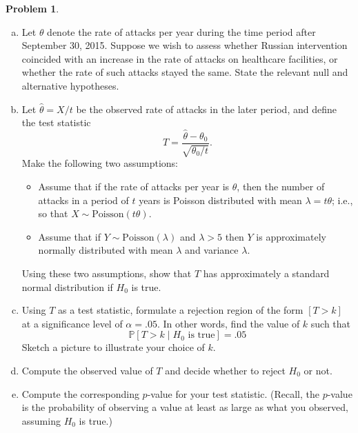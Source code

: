 \documentclass[10pt]{amsart}
\theoremstyle{definition}
\newtheorem{problem}[theorem]{Problem}
\newcommand{\1}[1]{\textbf{1}_{\left[#1\right]}} %
\def\P{\mathbb{P}} %
\begin{document}
\begin{problem}
\begin{enumerate}[(a)]
    \item Let $\theta$ denote the rate of attacks per year during the time
    period after September 30, 2015. Suppose we wish to assess whether Russian
    intervention coincided with an increase in the rate of attacks on
    healthcare facilities, or whether the rate of such attacks stayed the
    same. State the relevant null and alternative hypotheses.
    \item Let $\widehat{\theta} = X/t$ be the observed rate of attacks in the later
    period, and define the test statistic
    \begin{equation*}
      T = \frac{\widehat{\theta}- \theta_{0}}{\sqrt{\theta_{0}/t}}.
    \end{equation*}
    Make the following two assumptions:
    \begin{itemize}
      \item Assume that if the rate of attacks per year is $\theta$, then the
      number of attacks in a period of $t$ years is Poisson distributed with
      mean $\lambda=t \theta$; i.e., so that $X\sim \text{Poisson}(t\theta).$
      \item Assume that if $Y\sim \text{Poisson}(\lambda)$ and $\lambda>5$ then
      $Y$ is approximately normally distributed with mean $\lambda$ and
      variance $\lambda$.
    \end{itemize}
    Using these two assumptions, show that $T$ has approximately a standard
    normal distribution if $H_{0}$ is true.
    \item Using $T$ as a test statistic, formulate a rejection region of the
    form $\left[ T>k \right]$ at a significance level of $\alpha=.05$. In
    other words, find the value of $k$ such that
    \begin{equation*}
      \P\left[T>k \mid H_{0}\text{ is true}\right] = .05
    \end{equation*}
    Sketch a picture to illustrate your choice of $k$.
    \item Compute the observed value of $T$ and decide whether to reject
    $H_{0}$ or not.
    \item Compute the corresponding $p$-value for your test statistic.
    (Recall, the $p$-value is the probability of observing a value at least as
    large as what you observed, assuming $H_{0}$ is true.)
  \end{enumerate}
\end{problem}

\newpage
\end{document}
